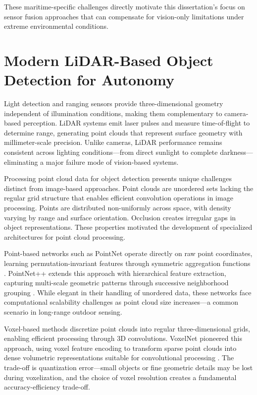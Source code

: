 \documentclass[../main.tex]{subfiles}
\begin{document}
These maritime-specific challenges directly motivate this dissertation's focus on sensor fusion approaches that can compensate for vision-only limitations under extreme environmental conditions.

\section{Modern LiDAR-Based Object Detection for Autonomy}

Light detection and ranging sensors provide three-dimensional geometry independent of illumination conditions, making them complementary to camera-based perception. LiDAR systems emit laser pulses and measure time-of-flight to determine range, generating point clouds that represent surface geometry with millimeter-scale precision. Unlike cameras, LiDAR performance remains consistent across lighting conditions—from direct sunlight to complete darkness—eliminating a major failure mode of vision-based systems.

Processing point cloud data for object detection presents unique challenges distinct from image-based approaches. Point clouds are unordered sets lacking the regular grid structure that enables efficient convolution operations in image processing. Points are distributed non-uniformly across space, with density varying by range and surface orientation. Occlusion creates irregular gaps in object representations. These properties motivated the development of specialized architectures for point cloud processing.

Point-based networks such as PointNet operate directly on raw point coordinates, learning permutation-invariant features through symmetric aggregation functions \cite{garcia-garcia2016}. PointNet++ extends this approach with hierarchical feature extraction, capturing multi-scale geometric patterns through successive neighborhood grouping \cite{garcia-garcia2016}. While elegant in their handling of unordered data, these networks face computational scalability challenges as point cloud size increases—a common scenario in long-range outdoor sensing.

Voxel-based methods discretize point clouds into regular three-dimensional grids, enabling efficient processing through 3D convolutions. VoxelNet pioneered this approach, using voxel feature encoding to transform sparse point clouds into dense volumetric representations suitable for convolutional processing \cite{zhou2018}. The trade-off is quantization error—small objects or fine geometric details may be lost during voxelization, and the choice of voxel resolution creates a fundamental accuracy-efficiency trade-off.
\end{document}
